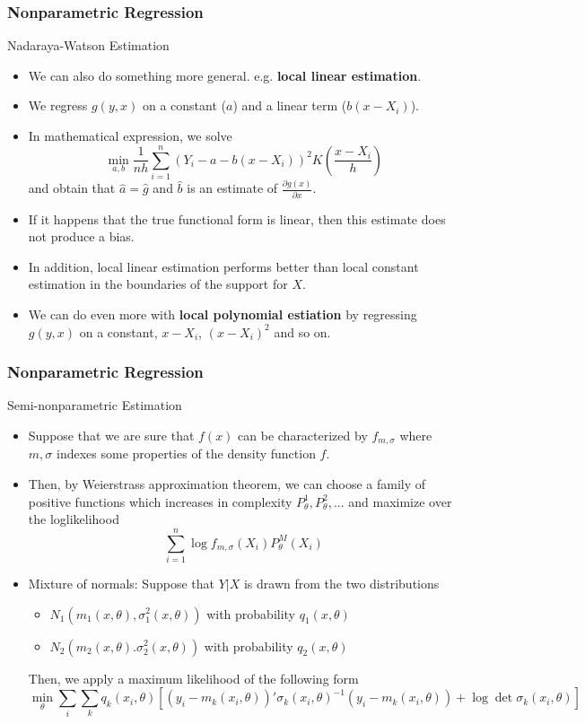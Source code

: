 \documentclass{beamer}
\begin{document}
\begin{frame}
\frametitle{Nonparametric Regression}
Nadaraya-Watson Estimation
\begin{itemize}
\item  We can also do something more general. e.g. \textbf{local linear estimation}. 
\item We regress $g(y,x)$ on a constant ($a$) and a linear term ($b(x-X_i)$).
\item In mathematical expression, we solve
 \[
 \min_{a,b}\frac{1}{nh}\sum_{i=1}^n(Y_i-a-b(x-X_i))^2K\left(\frac{x-X_i}{h}\right)
 \]
 and obtain that $\hat{a}=\hat{g}$ and $\hat{b}$ is an estimate of $\frac{\partial g(x)}{\partial x}$.
 \item If it happens that the true functional form is linear, then this estimate does not produce a bias.
 \item In addition, local linear estimation performs better than local constant estimation in the boundaries of the support for $X$. \par
 \item We can do even more with \textbf{local polynomial estiation} by regressing $g(y,x)$ on a constant, $x-X_i$, $(x-X_i)^2$ and so on. 
\end{itemize}
\end{frame}

\begin{frame}
\frametitle{Nonparametric Regression}
Semi-nonparametric Estimation
\begin{itemize}
\item Suppose that we are sure that $f(x)$ can be characterized by $f_{m,\sigma}$ where $m,\sigma$ indexes some properties of the density function $f$. 
\item Then, by Weierstrass approximation theorem, we can choose a family of positive functions which increases in complexity $P_\theta^1, P_\theta^2,...$ and maximize over the loglikelihood
\[
\sum_{i=1}^n \log{f_{m,\sigma}(X_i)}P_\theta^M(X_i)
\]
\item Mixture of normals: Suppose that $Y|X$ is drawn from the two distributions
\begin{itemize}
\item $N_1(m_1(x,\theta), \sigma_1^2(x,\theta))$ with probability $q_1(x,\theta)$
\item $N_2(m_2(x,\theta). \sigma_2^2(x,\theta))$ with probability $q_2(x,\theta)$
\end{itemize}
Then, we apply a maximum likelihood of the following form
\footnotesize{\[
\min_\theta \sum_i\sum_k q_k(x_i,\theta)[(y_i-m_k(x_i,\theta))'\sigma_k(x_i,\theta)^{-1}(y_i-m_k(x_i,\theta))+\log\det{\sigma_k(x_i,\theta)}]
\]}\normalsize
\end{itemize}
\end{frame}
\end{document}
